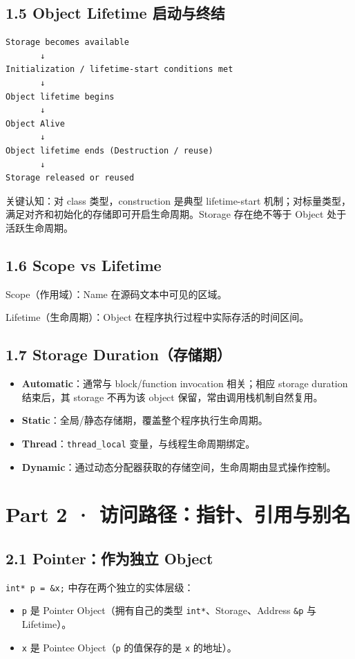\documentclass[11pt,a4paper]{article}
\begin{document}
\subsection{1.5 Object Lifetime 启动与终结}
\begin{lstlisting}[language=text]
Storage becomes available
       ↓
Initialization / lifetime-start conditions met
       ↓
Object lifetime begins
       ↓
Object Alive
       ↓
Object lifetime ends (Destruction / reuse)
       ↓
Storage released or reused
\end{lstlisting}
关键认知：对 class 类型，construction 是典型 lifetime-start 机制；对标量类型，满足对齐和初始化的存储即可开启生命周期。Storage 存在绝不等于 Object 处于活跃生命周期。

\subsection{1.6 Scope vs Lifetime}
Scope（作用域）：Name 在源码文本中可见的区域。

Lifetime（生命周期）：Object 在程序执行过程中实际存活的时间区间。

\subsection{1.7 Storage Duration（存储期）}
\begin{itemize}
  \item \textbf{Automatic}：通常与 block/function invocation 相关；相应 storage duration 结束后，其 storage 不再为该 object 保留，常由调用栈机制自然复用。
  \item \textbf{Static}：全局/静态存储期，覆盖整个程序执行生命周期。
  \item \textbf{Thread}：\texttt{thread\_local} 变量，与线程生命周期绑定。
  \item \textbf{Dynamic}：通过动态分配器获取的存储空间，生命周期由显式操作控制。
\end{itemize}
\section{Part 2 · 访问路径：指针、引用与别名}
\subsection{2.1 Pointer：作为独立 Object}
\texttt{int* p = \&x;} 中存在两个独立的实体层级：

\begin{itemize}
  \item \texttt{p} 是 Pointer Object（拥有自己的类型 \texttt{int*}、Storage、Address \texttt{\&p} 与 Lifetime）。
  \item \texttt{x} 是 Pointee Object（\texttt{p} 的值保存的是 \texttt{x} 的地址）。
\end{itemize}
\end{document}
